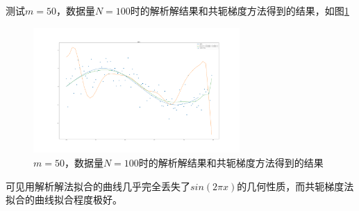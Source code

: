 测试$m = 50$，数据量$N = 100$时的解析解结果和共轭梯度方法得到的结果，如图\ref{m50}

\begin{figure}[htbp]
    \centering
    \includegraphics[width=0.7\textwidth]{figures/Figure_16.png}
    \caption{$m = 50$，数据量$N = 100$时的解析解结果和共轭梯度方法得到的结果}
    \label{m50}
\end{figure}

可见用解析解法拟合的曲线几乎完全丢失了$sin(2 \pi x)$的几何性质，而共轭梯度法拟合的曲线拟合程度极好。
